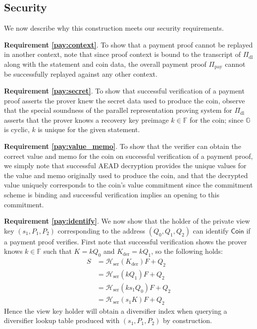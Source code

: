 \documentclass{llncs}
\newcommand{\G}{\mathbb{G}}
\newcommand{\F}{\mathbb{F}}
\newcommand{\hash}{\mathcal{H}}
\begin{document}
\subsection{Security}

We now describe why this construction meets our security requirements.

\textbf{Requirement \ref{pay:context}}. To show that a payment proof cannot be replayed in another context, note that since proof context is bound to the transcript of $\Pi_{\text{dl}}$ along with the statement and coin data, the overall payment proof $\Pi_{\text{pay}}$ cannot be successfully replayed against any other context.

\textbf{Requirement \ref{pay:secret}}. To show that successful verification of a payment proof asserts the prover knew the secret data used to produce the coin, observe that the special soundness of the parallel representation proving system for $\Pi_{\text{dl}}$ asserts that the prover knows a recovery key preimage $k \in \F$ for the coin; since $\G$ is cyclic, $k$ is unique for the given statement.

\textbf{Requirement \ref{pay:value_memo}}. To show that the verifier can obtain the correct value and memo for the coin on successful verification of a payment proof, we simply note that successful AEAD decryption provides the unique values for the value and memo originally used to produce the coin, and that the decrypted value uniquely corresponds to the coin's value commitment since the commitment scheme is binding and successful verification implies an opening to this commitment.

\textbf{Requirement \ref{pay:identify}}. We now show that the holder of the private view key $(s_1,P_1,P_2)$ corresponding to the address $(Q_0,Q_1,Q_2)$ can identify $\textsf{Coin}$ if a payment proof verifies.
First note that successful verification shows the prover knows $k \in \F$ such that $K = kQ_0$ and $K_{\text{der}} = kQ_1$, so the following holds:
\begin{align*}
    S &= \hash_{\text{ser}}(K_{\text{der}})F + Q_2 \\
    &= \hash_{\text{ser}}(kQ_1)F + Q_2 \\
    &= \hash_{\text{ser}}(ks_1 Q_0)F + Q_2 \\
    &= \hash_{\text{ser}}(s_1 K)F + Q_2
\end{align*}
Hence the view key holder will obtain a diversifier index when querying a diversifier lookup table produced with $(s_1,P_1,P_2)$ by construction.
\end{document}
